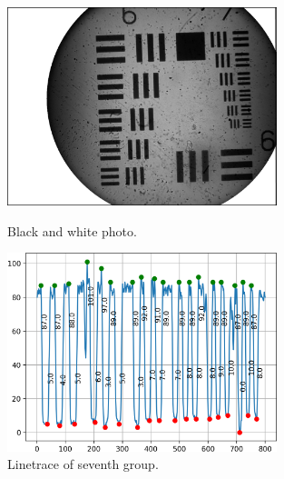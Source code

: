 \begin{figure}[h!]
    \centering
    \begin{minipage}{0.45\textwidth}
      \centering
      \includegraphics[width=0.7\textwidth,keepaspectratio]{afbeeldingen/process_visibility/m3_bw.jpg}
      \caption{Black and white photo.}
      \label{fig:resolution_target}
    \end{minipage}%
    \begin{minipage}{.45\textwidth}
      \centering
      \includegraphics[width=0.7\textwidth,keepaspectratio]{afbeeldingen/process_visibility/m3_rpg_7.png}
      \caption{Linetrace of seventh group.}
      \label{fig:linetrace}
    \end{minipage}
\end{figure}


